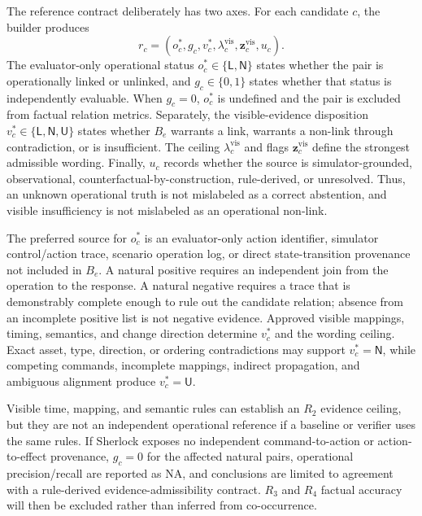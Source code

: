 \documentclass[conference]{IEEEtran}
\newcommand{\NA}{\textsc{NA}}
\begin{document}
The reference contract deliberately has two axes. For each candidate $c$, the builder produces
\begin{equation}
r_c=(o_c^*,g_c,v_c^*,\lambda_c^{\mathrm{vis}},
\mathbf{z}_c^{\mathrm{vis}},u_c).
\end{equation}
The evaluator-only operational status $o_c^*\in\{\mathsf{L},\mathsf{N}\}$ states whether the pair is operationally linked or unlinked, and $g_c\in\{0,1\}$ states whether that status is independently evaluable. When $g_c=0$, $o_c^*$ is undefined and the pair is excluded from factual relation metrics. Separately, the visible-evidence disposition $v_c^*\in\{\mathsf{L},\mathsf{N},\mathsf{U}\}$ states whether $B_e$ warrants a link, warrants a non-link through contradiction, or is insufficient. The ceiling $\lambda_c^{\mathrm{vis}}$ and flags $\mathbf{z}_c^{\mathrm{vis}}$ define the strongest admissible wording. Finally, $u_c$ records whether the source is simulator-grounded, observational, counterfactual-by-construction, rule-derived, or unresolved. Thus, an unknown operational truth is not mislabeled as a correct abstention, and visible insufficiency is not mislabeled as an operational non-link.

The preferred source for $o_c^*$ is an evaluator-only action identifier, simulator control/action trace, scenario operation log, or direct state-transition provenance not included in $B_e$. A natural positive requires an independent join from the operation to the response. A natural negative requires a trace that is demonstrably complete enough to rule out the candidate relation; absence from an incomplete positive list is not negative evidence. Approved visible mappings, timing, semantics, and change direction determine $v_c^*$ and the wording ceiling. Exact asset, type, direction, or ordering contradictions may support $v_c^*=\mathsf{N}$, while competing commands, incomplete mappings, indirect propagation, and ambiguous alignment produce $v_c^*=\mathsf{U}$.

Visible time, mapping, and semantic rules can establish an $R_2$ evidence ceiling, but they are not an independent operational reference if a baseline or verifier uses the same rules. If Sherlock exposes no independent command-to-action or action-to-effect provenance, $g_c=0$ for the affected natural pairs, operational precision/recall are reported as \NA, and conclusions are limited to agreement with a rule-derived evidence-admissibility contract. $R_3$ and $R_4$ factual accuracy will then be excluded rather than inferred from co-occurrence.
\end{document}
